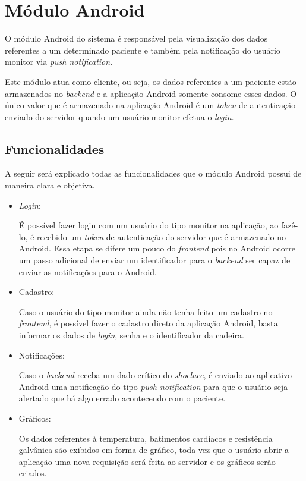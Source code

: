 \section{Módulo Android}

O módulo Android do sistema é responsável pela visualização dos dados referentes a um
determinado paciente e também pela notificação do usuário monitor via 
\textit{push notification}.

Este módulo atua como cliente, ou seja, os dados referentes a um paciente estão armazenados
no \textit{backend} e a aplicação Android somente consome esses dados. O único valor que é
armazenado na aplicação Android é um \textit{token} de autenticação enviado do servidor quando
um usuário monitor efetua o \textit{login}.

\subsection{Funcionalidades}

A seguir será explicado todas as funcionalidades que o módulo Android possui de maneira clara e objetiva. 

\begin{itemize}

\item \textit{Login}:

É possível fazer login com um usuário do tipo monitor na aplicação, ao fazê-lo, é recebido um
\textit{token} de autenticação do servidor que é armazenado no Android. Essa etapa se difere
um pouco do \textit{frontend} pois no Android ocorre um passo adicional de enviar um
identificador para o \textit{backend} ser capaz de enviar as notificações para o Android.

\item Cadastro:

Caso o usuário do tipo monitor ainda não tenha feito um cadastro no \textit{frontend}, é
possível fazer o cadastro direto da aplicação Android, basta informar os dados de 
\textit{login}, senha e o identificador da cadeira.

\item Notificações:

Caso o \textit{backend} receba um dado crítico do \textit{shoelace}, é enviado ao aplicativo
Android uma notificação do tipo \textit{push notification} para que o usuário seja alertado
que há algo errado acontecendo com o paciente.

\item Gráficos:

Os dados referentes à temperatura, batimentos cardíacos e resistência galvânica são exibidos
em forma de gráfico, toda vez que o usuário abrir a aplicação uma nova requisição será feita
ao servidor e os gráficos serão criados.

\end{itemize}

